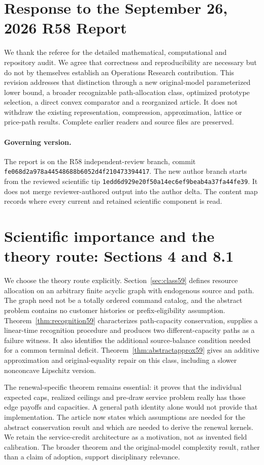 \section*{Response to the September 26, 2026 R58 Report}
We thank the referee for the detailed mathematical, computational and repository audit. We agree that correctness and reproducibility are necessary but do not by themselves establish an Operations Research contribution. This revision addresses that distinction through a new original-model parameterized lower bound, a broader recognizable path-allocation class, optimized prototype selection, a direct convex comparator and a reorganized article. It does not withdraw the existing representation, compression, approximation, lattice or price-path results. Complete earlier readers and source files are preserved.

\paragraph{Governing version.}
The report is  on the R58 independent-review branch, commit \nolinkurl{fe068d2a978a44548688b6052d4f210473394417}. The new author branch starts from the reviewed scientific tip \nolinkurl{1edd6d929e20f50a14ec6ef9beab4a37fa44fe39}. It does not merge reviewer-authored output into the author delta. The content map records where every current and retained scientific component is read.

\section{Scientific importance and the theory route: Sections 4 and 8.1}
We choose the theory route explicitly. Section~\ref{sec:class59} defines resource allocation on an arbitrary finite acyclic graph with endogenous source and path. The graph need not be a totally ordered command catalog, and the abstract problem contains no customer histories or prefix-eligibility assumption. Theorem~\ref{thm:recognition59} characterizes path-capacity conservation, supplies a linear-time recognition procedure and produces two different-capacity paths as a failure witness. It also identifies the additional source-balance condition needed for a common terminal deficit. Theorem~\ref{thm:abstractapprox59} gives an additive approximation and original-equality repair on this class, including a slower nonconcave Lipschitz version.

The renewal-specific theorem remains essential: it proves that the individual expected caps, realized ceilings and pre-draw service problem really has those edge payoffs and capacities. A general path identity alone would not provide that implementation. The article now states which assumptions are needed for the abstract conservation result and which are needed to derive the renewal kernels. We retain the service-credit architecture as a motivation, not as invented field calibration. The broader theorem and the original-model complexity result, rather than a claim of adoption, support disciplinary relevance.

